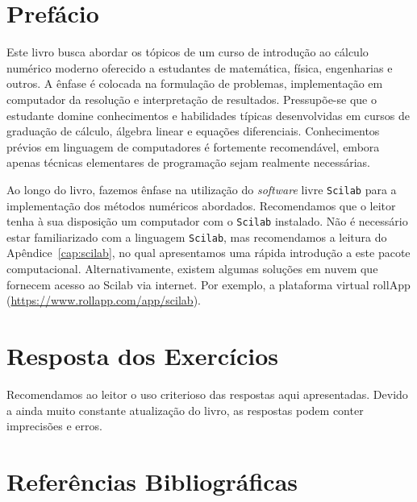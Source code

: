 \documentclass[12pt,a4paper]{book}
\begin{document}
\chapter*{Prefácio}

Este livro busca abordar os tópicos de um curso de introdução ao cálculo numérico moderno oferecido a estudantes de matemática, física, engenharias e outros. A ênfase é colocada na formulação de problemas, implementação em computador da resolução e interpretação de resultados. Pressupõe-se que o estudante domine conhecimentos e habilidades típicas desenvolvidas em cursos de graduação de cálculo, álgebra linear e equações diferenciais. Conhecimentos prévios em linguagem de computadores é fortemente recomendável, embora apenas técnicas elementares de programação sejam realmente necessárias.

\ifisscilab
Ao longo do livro, fazemos ênfase na utilização do \emph{software} livre \verb+Scilab+ para a implementação dos métodos numéricos abordados. Recomendamos que o leitor tenha à sua disposição um computador com o \verb+Scilab+ instalado. Não é necessário estar familiarizado com a linguagem \verb+Scilab+, mas recomendamos a leitura do Apêndice~\ref{cap:scilab}, no qual apresentamos uma rápida introdução a este pacote computacional. Alternativamente, existem algumas soluções em nuvem que fornecem acesso ao Scilab via internet. Por exemplo, a plataforma virtual rollApp (\url{https://www.rollapp.com/app/scilab}).
\fi

\tableofcontents

\mainmatter










\ifisscilab
\appendix

\fi

\chapter*{Resposta dos Exercícios}
Recomendamos ao leitor o uso criterioso das respostas aqui apresentadas. Devido a ainda muito constante atualização do livro, as respostas podem conter imprecisões e erros.
\shipoutAnswer  

\nocite{*}

\begingroup
\chapter*{Referências Bibliográficas}
\renewcommand{\chapter}[2]{}

\endgroup

\clearpage
{}
\printindex
\end{document}
